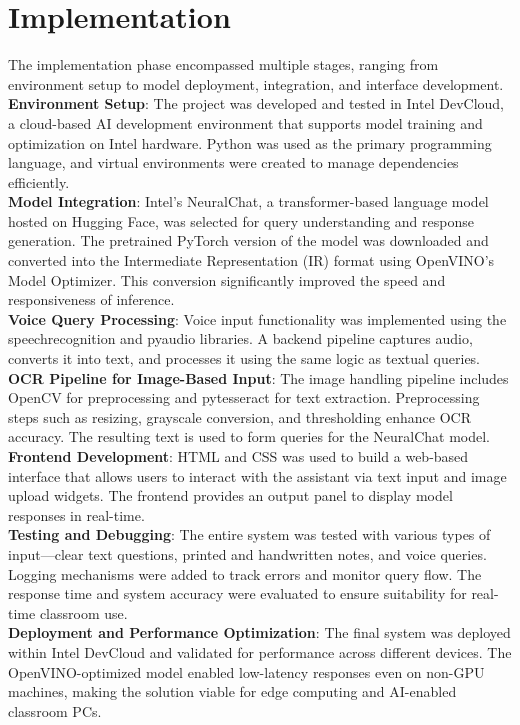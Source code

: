 \documentclass{josis}
\begin{document}
\section{Implementation}
The implementation phase encompassed multiple stages, ranging from environment setup to model deployment, integration, and interface development.\\
\textbf{Environment Setup}: The project was developed and tested in Intel DevCloud, a cloud-based AI development environment that supports model training and optimization on Intel hardware. Python was used as the primary programming language, and virtual environments were created to manage dependencies efficiently.\\
\textbf{Model Integration}: Intel's NeuralChat, a transformer-based language model hosted on Hugging Face, was selected for query understanding and response generation. The pretrained PyTorch version of the model was downloaded and converted into the Intermediate Representation (IR) format using OpenVINO's Model Optimizer. This conversion significantly improved the speed and responsiveness of inference.\\
\textbf{Voice Query Processing}: Voice input functionality was implemented using the speechrecognition and pyaudio libraries. A backend pipeline captures audio, converts it into text, and processes it using the same logic as textual queries.\\
\textbf{OCR Pipeline for Image-Based Input}: The image handling pipeline includes OpenCV for preprocessing and pytesseract for text extraction. Preprocessing steps such as resizing, grayscale conversion, and thresholding enhance OCR accuracy. The resulting text is used to form queries for the NeuralChat model.\\
\textbf{Frontend Development}: HTML and CSS was used to build a web-based interface that allows users to interact with the assistant via text input and image upload widgets. The frontend provides an output panel to display model responses in real-time.\\
\textbf{Testing and Debugging}: The entire system was tested with various types of input—clear text questions, printed and handwritten notes, and voice queries. Logging mechanisms were added to track errors and monitor query flow. The response time and system accuracy were evaluated to ensure suitability for real-time classroom use.\\
\textbf{Deployment and Performance Optimization}: The final system was deployed within Intel DevCloud and validated for performance across different devices. The OpenVINO-optimized model enabled low-latency responses even on non-GPU machines, making the solution viable for edge computing and AI-enabled classroom PCs.
\end{document}
